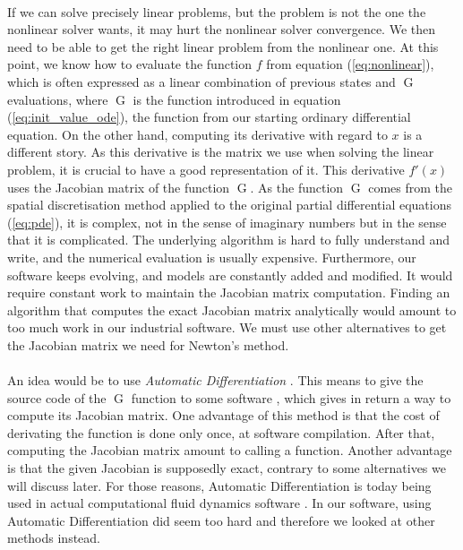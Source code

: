       \paragraph{}
      If we can solve precisely linear problems, but the problem is not the one the nonlinear solver wants, it may hurt the nonlinear solver convergence.
      We then need to be able to get the right linear problem from the nonlinear one.
      At this point, we know how to evaluate the function $f$ from equation (\ref{eq:nonlinear}), which is often expressed as a linear combination of previous states and $\operatorname{G}$ evaluations, where $\operatorname{G}$ is the function introduced in equation (\ref{eq:init_value_ode}), the function from our starting ordinary differential equation.
      On the other hand, computing its derivative with regard to $x$ is a different story.
      As this derivative is the matrix we use when solving the linear problem, it is crucial to have a good representation of it.
      This derivative $f'\left(x\right)$ uses the Jacobian matrix of the function $\operatorname{G}$.
      As the function $\operatorname{G}$ comes from the spatial discretisation method applied to the original partial differential equations (\ref{eq:pde}), it is complex, not in the sense of imaginary numbers but in the sense that it is complicated.
      The underlying algorithm is hard to fully understand and write, and the numerical evaluation is usually expensive.
      Furthermore, our software keeps evolving, and models are constantly added and modified.
      It would require constant work to maintain the Jacobian matrix computation.
      Finding an algorithm that computes the exact Jacobian matrix analytically would amount to too much work in our industrial software.
      We must use other alternatives to get the Jacobian matrix we need for Newton's method.

      \paragraph{}
      An idea would be to use \emph{Automatic Differentiation} \cite{Griewank2000}.
      This means to give the source code of the $\operatorname{G}$ function to some software \cite{HascoeetPascual2012}, which gives in return a way to compute its Jacobian matrix.
      One advantage of this method is that the cost of derivating the function is done only once, at software compilation.
      After that, computing the Jacobian matrix amount to calling a function.
      Another advantage is that the given Jacobian is supposedly exact, contrary to some alternatives we will discuss later.
      For those reasons, Automatic Differentiation is today being used in actual computational fluid dynamics software \cite{BilanceriBeuxElmahiEtAl2011, KenwayMaderHeEtAl2019}.
      In our software, using Automatic Differentiation did seem too hard and therefore we looked at other methods instead.

